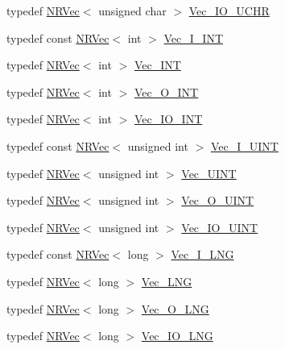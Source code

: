 \begin{DoxyCompactItemize}
\item 
typedef \mbox{\hyperlink{classNR_1_1NRVec}{N\+R\+Vec}}$<$ unsigned char $>$ \mbox{\hyperlink{namespaceNR_ad0cd08c957bbfcd9b612069da683fed4}{Vec\+\_\+\+I\+O\+\_\+\+U\+C\+HR}}
\item 
typedef const \mbox{\hyperlink{classNR_1_1NRVec}{N\+R\+Vec}}$<$ int $>$ \mbox{\hyperlink{namespaceNR_ae67ce7dc86a8a64a7ce73c3c030ff610}{Vec\+\_\+\+I\+\_\+\+I\+NT}}
\item 
typedef \mbox{\hyperlink{classNR_1_1NRVec}{N\+R\+Vec}}$<$ int $>$ \mbox{\hyperlink{namespaceNR_a8ee8e979fd889af3f190d7f678756f24}{Vec\+\_\+\+I\+NT}}
\item 
typedef \mbox{\hyperlink{classNR_1_1NRVec}{N\+R\+Vec}}$<$ int $>$ \mbox{\hyperlink{namespaceNR_ade2338f6d53b7da3dd6d1c04804541f2}{Vec\+\_\+\+O\+\_\+\+I\+NT}}
\item 
typedef \mbox{\hyperlink{classNR_1_1NRVec}{N\+R\+Vec}}$<$ int $>$ \mbox{\hyperlink{namespaceNR_a3b8558419263875cc467f92b0ef4aba7}{Vec\+\_\+\+I\+O\+\_\+\+I\+NT}}
\item 
typedef const \mbox{\hyperlink{classNR_1_1NRVec}{N\+R\+Vec}}$<$ unsigned int $>$ \mbox{\hyperlink{namespaceNR_afd875cd4a9ff5a070ac7b7e5d5e6d145}{Vec\+\_\+\+I\+\_\+\+U\+I\+NT}}
\item 
typedef \mbox{\hyperlink{classNR_1_1NRVec}{N\+R\+Vec}}$<$ unsigned int $>$ \mbox{\hyperlink{namespaceNR_a891b8cd2a3c0e5ce8bd7c605dba2bdd1}{Vec\+\_\+\+U\+I\+NT}}
\item 
typedef \mbox{\hyperlink{classNR_1_1NRVec}{N\+R\+Vec}}$<$ unsigned int $>$ \mbox{\hyperlink{namespaceNR_aa2c2f818c1de114f74a2c3ea1f639da4}{Vec\+\_\+\+O\+\_\+\+U\+I\+NT}}
\item 
typedef \mbox{\hyperlink{classNR_1_1NRVec}{N\+R\+Vec}}$<$ unsigned int $>$ \mbox{\hyperlink{namespaceNR_a2da77c23b3ef6c69b5ad3971441ea6bc}{Vec\+\_\+\+I\+O\+\_\+\+U\+I\+NT}}
\item 
typedef const \mbox{\hyperlink{classNR_1_1NRVec}{N\+R\+Vec}}$<$ long $>$ \mbox{\hyperlink{namespaceNR_ad78c9dbf732a4dd8cb20450b729296a1}{Vec\+\_\+\+I\+\_\+\+L\+NG}}
\item 
typedef \mbox{\hyperlink{classNR_1_1NRVec}{N\+R\+Vec}}$<$ long $>$ \mbox{\hyperlink{namespaceNR_a815b8cf6e3ded65e3394a3f631d9d2e2}{Vec\+\_\+\+L\+NG}}
\item 
typedef \mbox{\hyperlink{classNR_1_1NRVec}{N\+R\+Vec}}$<$ long $>$ \mbox{\hyperlink{namespaceNR_a1260716c95164012314152d97535c2fa}{Vec\+\_\+\+O\+\_\+\+L\+NG}}
\item 
typedef \mbox{\hyperlink{classNR_1_1NRVec}{N\+R\+Vec}}$<$ long $>$ \mbox{\hyperlink{namespaceNR_ab3ee168d5645ca3b231102152fc5a433}{Vec\+\_\+\+I\+O\+\_\+\+L\+NG}}

\end{DoxyCompactItemize}
